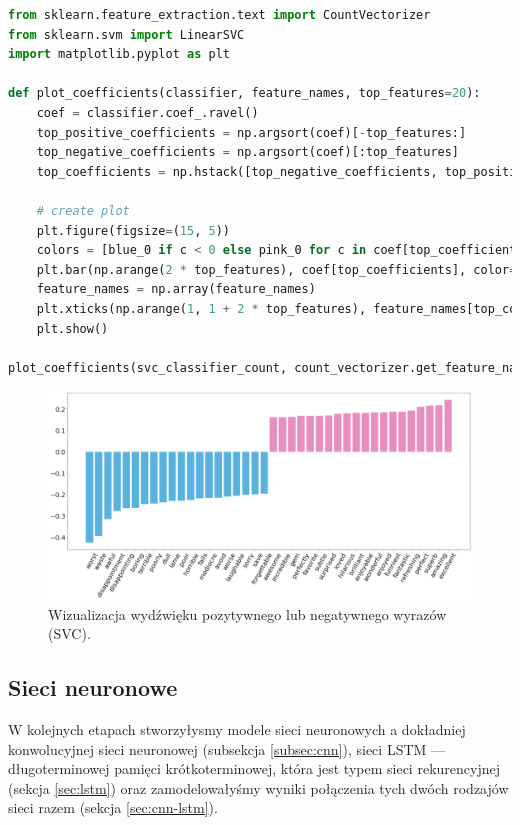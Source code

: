 \begin{lstlisting}[language=Python,frame=single, breaklines=true, caption=Wizualizacja po SVC.,label=code:svc-visual]
from sklearn.feature_extraction.text import CountVectorizer
from sklearn.svm import LinearSVC
import matplotlib.pyplot as plt

def plot_coefficients(classifier, feature_names, top_features=20):
	coef = classifier.coef_.ravel()
	top_positive_coefficients = np.argsort(coef)[-top_features:]
	top_negative_coefficients = np.argsort(coef)[:top_features]
	top_coefficients = np.hstack([top_negative_coefficients, top_positive_coefficients])
	
	# create plot
	plt.figure(figsize=(15, 5))
	colors = [blue_0 if c < 0 else pink_0 for c in coef[top_coefficients]]
	plt.bar(np.arange(2 * top_features), coef[top_coefficients], color=colors)
	feature_names = np.array(feature_names)
	plt.xticks(np.arange(1, 1 + 2 * top_features), feature_names[top_coefficients], rotation=60, ha='right')
	plt.show()

plot_coefficients(svc_classifier_count, count_vectorizer.get_feature_names())	
\end{lstlisting}

\begin{figure}[H]
	\centering
	\includegraphics[width=1\linewidth]{images/chapter3/svc-visual.pdf}
	\caption{Wizualizacja wydźwięku pozytywnego lub negatywnego wyrazów (SVC).}
	\label{fig:visual-svc}
\end{figure}



\subsection{Sieci neuronowe}
W kolejnych etapach stworzyłysmy modele sieci neuronowych a dokładniej konwolucyjnej sieci neuronowej (subsekcja \ref{subsec:cnn}), sieci LSTM --- długoterminowej pamięci krótkoterminowej, która jest typem sieci rekurencyjnej (sekcja \ref{sec:lstm}) oraz zamodelowałyśmy wyniki połączenia tych dwóch rodzajów sieci razem (sekcja \ref{sec:cnn-lstm}).


